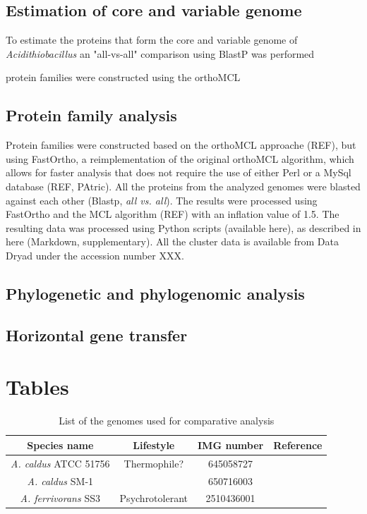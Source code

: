\documentclass[11pt]{article}
\begin{document}
\subsection{Estimation of core and variable genome}

To estimate the proteins that form the core and variable genome of \textit{Acidithiobacillus} an "all-vs-all" comparison using BlastP was performed


protein families were constructed using the orthoMCL 

\subsection*{Protein family analysis}

Protein families were constructed based on the orthoMCL approache (REF), but using FastOrtho, a reimplementation of the original orthoMCL algorithm, which allows for faster analysis that does not require the use of either Perl or a MySql database (REF, PAtric). All the proteins from the analyzed genomes were blasted against each other (Blastp, \textit{all vs. all}). The results were processed using FastOrtho and the MCL algorithm (REF) with an inflation value of 1.5. The resulting data was processed using Python scripts (available here), as described in here (Markdown, supplementary). All the cluster data is available from Data Dryad under the accession number XXX.

\subsection*{Phylogenetic and phylogenomic analysis}
\subsection*{Horizontal gene transfer}

\section*{Tables}

\begin{table}[h!]
\caption{List of the genomes used for comparative analysis}
      \begin{tabular}{cccc}
        \hline
        \textbf{Species name} & \textbf{Lifestyle} & \textbf{IMG number} & \textbf{Reference} \\ \hline
        
        \textit{A. caldus} ATCC 51756 & Thermophile? & 645058727 & \cite{Valdes:2009dn}\\
        
        \textit{A. caldus} SM-1 & & 650716003 & \cite{You:2011es}\\
        
        \textit{A. ferrivorans} SS3 & Psychrotolerant & 2510436001 & \cite{Liljeqvist:2011gi} \\
        
         
      \end{tabular}
\label{GenomeList}
\end{table}



\end{document}
